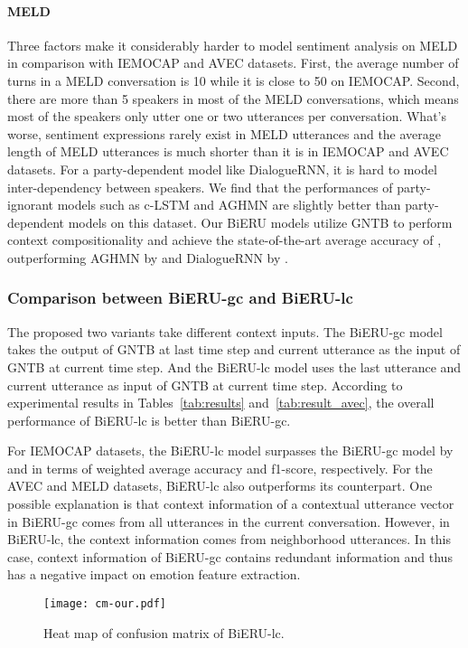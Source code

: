 \documentclass[journal]{IEEEtran}
\begin{document}
\paragraph{MELD}
Three factors make it considerably harder to model sentiment analysis on MELD in comparison with IEMOCAP and AVEC datasets. First, the average number of turns in a MELD conversation is 10 while it is close to 50 on IEMOCAP. Second, there are more than 5 speakers in most of the MELD conversations, which means most of the speakers only utter one or two utterances per conversation. What's worse, sentiment expressions rarely exist in MELD utterances and the average length of MELD utterances is much shorter than it is in IEMOCAP and AVEC datasets. For a party-dependent model like DialogueRNN, it is hard to model inter-dependency between speakers. We find that the performances of party-ignorant models such as c-LSTM and AGHMN are slightly better than party-dependent models on this dataset. Our BiERU models utilize GNTB to perform context compositionality and achieve the state-of-the-art average accuracy of , outperforming AGHMN by  and DialogueRNN by .

\subsubsection{Comparison between BiERU-gc and BiERU-lc}
The proposed two variants take different context inputs. The BiERU-gc model takes the output of GNTB at last time step and current utterance as the input of GNTB at current time step. And the BiERU-lc model uses the last utterance and current utterance as input of GNTB at current time step. According to experimental results in Tables~\ref{tab:results} and~\ref{tab:result_avec}, the overall performance of BiERU-lc is better than BiERU-gc.

For IEMOCAP datasets, the BiERU-lc model surpasses the BiERU-gc model by  and  in terms of weighted average accuracy and f1-score, respectively. For the AVEC and MELD datasets, BiERU-lc also outperforms its counterpart. One possible explanation is that context information of a contextual utterance vector in BiERU-gc comes from all utterances in the current conversation. However, in BiERU-lc, the context information comes from neighborhood utterances. In this case, context information of BiERU-gc contains redundant information and thus has a negative impact on emotion feature extraction.

\begin{figure}[!ht]
    \centering
	\texttt{[image: cm-our.pdf]}
	\linespread{1}
    \caption{Heat map of confusion matrix of BiERU-lc.}
\label{fig:heatmap}
\end{figure}{}
\end{document}
